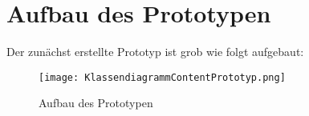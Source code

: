 \author{Gottfried von Recum}
\chapter{Aufbau des Prototypen}

Der zunächst erstellte Prototyp ist grob wie folgt aufgebaut:
\begin{figure}[h]
	\centering
	\texttt{[image: KlassendiagrammContentPrototyp.png]}
	\caption{Aufbau des Prototypen}
	\label{fig:Prototypaufbau}
\end{figure}